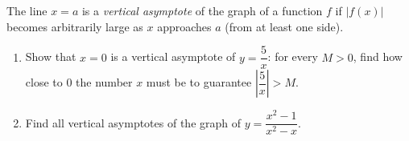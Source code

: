The line $x=a$ is a \emph{vertical asymptote} of the graph of a function $f$ if $|f(x)|$ becomes arbitrarily large as $x$ approaches $a$ (from at least one side).
\begin{enumerate}
\item[(a)] Show that $x=0$ is a vertical asymptote of $y=\dfrac5x$: for every $M>0$, find how close to $0$ the number $x$ must be to guarantee $\left|\dfrac5x\right|>M$.
\item[(b)] Find all vertical asymptotes of the graph of $y=\dfrac{x^2-1}{x^2-x}$.
\end{enumerate}
